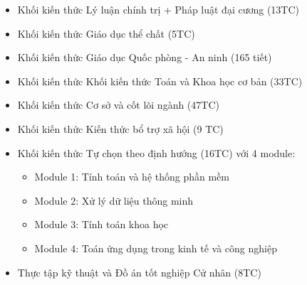 \documentclass[12pt,a4paper]{report}
\begin{document}
    \begin{itemize}
        \item Khối kiến thức Lý luận chính trị + Pháp luật đại cương (13TC)
        \item Khối kiến thức Giáo dục thể chất (5TC)
        \item Khối kiến thức Giáo dục Quốc phòng - An ninh (165 tiết)
        \item Khối kiến thức Khối kiến thức Toán và Khoa học cơ bản (33TC)
        \item Khối kiến thức Cơ sở và cốt lõi ngành (47TC)
        \item Khối kiến thức Kiến thức bổ trợ xã hội (9 TC)
        \item Khối kiến thức Tự chọn theo định hướng (16TC) với 4 module:
            \begin{itemize}
                \item Module 1: Tính toán và hệ thống phần mềm
                \item Module 2: Xử lý dữ liệu thông minh
                \item Module 3: Tính toán khoa học
                \item Module 4: Toán ứng dụng trong kinh tế và công nghiệp
            \end{itemize}
        \item Thực tập kỹ thuật và Đồ án tốt nghiệp Cử nhân (8TC)
    \end{itemize}
    
\end{document}
